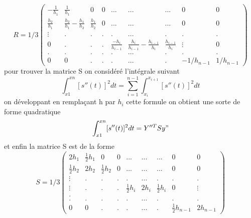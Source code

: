 \documentclass[11pt]{report}
\begin{document}
$$R=1/3\begin{pmatrix} -\frac{1}{h_1}&\frac{1}{h_1}&0&0&...&...&...&0&0 \\ \frac{h_2}{h_1}&\frac{h_2}{h_1}-\frac{h_1}{h_2}&\frac{h_1}{h_2}&0&...&...&...&0&0 \\ \vdots&.&.&.&.&...&.&.&.\\ 0&.&.&.&\frac{-h_i}{h_{i-1}}&\frac{h_i}{h_{i-1}}-\frac{h_{i-1}}{h_i}&\frac{h_{i-1}}{h_i}&\vdots&0 \\.&.&.&.&.&...&.&.&. \\ 0&0&.&.&.&...&.&-1/h_{n-1}&1/h_{n-1} \end{pmatrix}$$\newpage
pour trouver la matrice S on considéré  l'intégrale suivant \\
$$\int_{x1}^{xn}[s''(t)]^2dt=\sum_{i=1}^{n-1}\int_{x_i}^{x_{i+1}}[s''(t)]^2dt$$
on développant en remplaçant h par $h_i$   cette formule on obtient une sorte de forme quadratique  $$\int_{x1}^{xn}[s''(t)]^2dt= Y''^T S y"$$
et enfin la matrice S est de la forme 
$$S=1/3\begin{pmatrix} 2h_1&\frac{1}{2}h_1&0&0&...&...&...&0&0 \\ \frac{1}{2}h_2&2h_2&\frac{1}{2}h_2&0&...&...&...&0&0 \\ \vdots&.&.&.&.&...&.&.&.\\ \vdots&.&.&.&\frac{1}{2}h_i&2h_i&\frac{1}{2}h_i&0&\vdots \\. \\.&.&.&.&.&...&.&.&. \\ 0&0&.&.&.&...&.&\frac{1}{2}h_{n-1}&2h_{n-1} \end{pmatrix}$$
\end{document}
